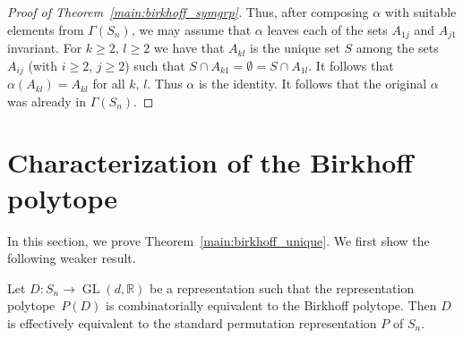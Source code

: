 \documentclass[ALCO,Unicode]{cedram}
\renewcommand{\geq}{\geqslant}
\newcommand{\reals}{\mathbb{R}}
\DeclareMathOperator{\GL}{GL}
\begin{document}
\begin{proof}[Proof of Theorem~\ref{main:birkhoff_symgrp}]
  Thus, after composing $\alpha$ with suitable elements
  from $\Gamma(S_n)$, 
  we may assume that $\alpha$ leaves each of the sets
  $A_{1j}$ and $A_{j1}$ invariant.
  For $k\geq 2$, $l\geq 2$ we have that
  $A_{kl}$ is the unique set $S$ among the sets
  $A_{ij}$ (with $i\geq 2$, $j\geq 2$)
  such that $S\cap A_{k1}=\emptyset = S\cap A_{1l}$.
  It follows that
  $\alpha(A_{kl})=A_{kl}$ for all $k$, $l$.
  Thus $\alpha$ is the identity.
  It follows that the original $\alpha$ was already in 
  $\Gamma(S_n)$. 
\end{proof}

\section{Characterization of the Birkhoff polytope}
In this section, we prove Theorem~\ref{main:birkhoff_unique}.
We first show the following weaker result.

\begin{lemma}\label{l:snbirk_unique}
  Let $D\colon S_n \to \GL(d,\reals)$ be a representation 
  such that the representation polytope~$P(D)$ is combinatorially
  equivalent to the Birkhoff polytope.
  Then $D$ is effectively equivalent to 
  the standard permutation representation $P$ of $S_n$.  
\end{lemma}
\end{document}
